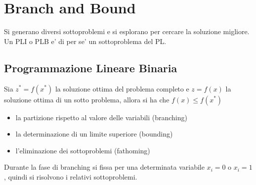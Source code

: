 \chapter{Branch and Bound}

Si generano diversi sottoproblemi e si esplorano per cercare la soluzione migliore.
Un PLI o PLB e' di per se' un sottoproblema del PL.

\section{Programmazione Lineare Binaria}

Sia $z^* = f(x^*)$ la soluzione ottima del problema completo e $z = f(x)$ la soluzione ottima di un sotto problema, allora si ha che $f(x) \leq f(x^*)$

\begin{itemize}
    \item la partizione rispetto al valore delle variabili (branching)
    \item la determinazione di un limite superiore (bounding)
    \item l'eliminazione dei sottoproblemi (fathoming)
\end{itemize}

Durante la fase di branching si fissa per una determinata variabile $x_i = 0$ o $x_i = 1$, quindi si risolvono i relativi sottoproblemi.
